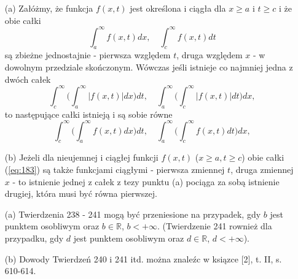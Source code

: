 \documentclass[leqno]{article}
\begin{document}
\begin{justify}
\begin{theorem}
{
    \begin{itemize}
        \item [(a)]
            Załóżmy, że funkcja $f(x,t)$ jest określona i ciągła dla $x \geqslant a$ i $t \geqslant c$ i że obie całki 
            \begin{equation}\label{eq:183}
                \int_{a}^{\infty}f(x,t)dx, \quad \int_{c}^{\infty}f(x,t)dt
            \end{equation}
            są zbieżne jednostajnie - pierwsza względem $t$, druga względem $x$ - w dowolnym przedziale skończonym. Wówczas jeśli istnieje co najmniej jedna z dwóch całek 
            \[
                \int_{c}^{\infty}\Big( \int_{a}^{\infty}|f(x,t)|dx\Big)dt, \quad \int_{a}^{\infty}\Big( \int_{c}^{\infty}|f(x,t)|dt\Big)dx,
            \]
            to następujące całki istnieją i są sobie równe
            \[
                \int_{c}^{\infty}\Big( \int_{a}^{\infty}f(x,t)dx\Big)dt, \quad \int_{a}^{\infty}\Big( \int_{c}^{\infty}f(x,t)dt\Big)dx,
            \]
        \item [(b)] 
            Jeżeli dla nieujemnej i ciągłej funkcji $f(x,t)$ ($x \geqslant a, t \geqslant c$) obie całki (\ref{eq:183}) są także funkcjami ciągłymi 
            - pierwsza zmiennej $t$, druga zmiennej $x$ - to istnienie jednej z całek z tezy punktu (a) pociąga za sobą istnienie drugiej, która musi być równa pierwszej.
    \end{itemize}
}
\end{theorem}

\begin{uwaga}
    \begin{itemize}
        \item [(a)] Twierdzenia 238 - 241 mogą być przeniesione na przypadek, gdy $b$ jest punktem osobliwym oraz $b \in \mathbb{R}$, $b < +\infty$.
            (Twierdzenie 241 rownież dla przypadku, gdy $d$ jest punktem osobliwym oraz $d \in \mathbb{R}$, $d < +\infty$).
        \item [(b)] Dowody Twierdzeń 240 i 241 itd. można znaleźc w ksiązce [2], t. II, s. 610-614.
    \end{itemize}
\end{uwaga}


\end{justify}
\end{document}
